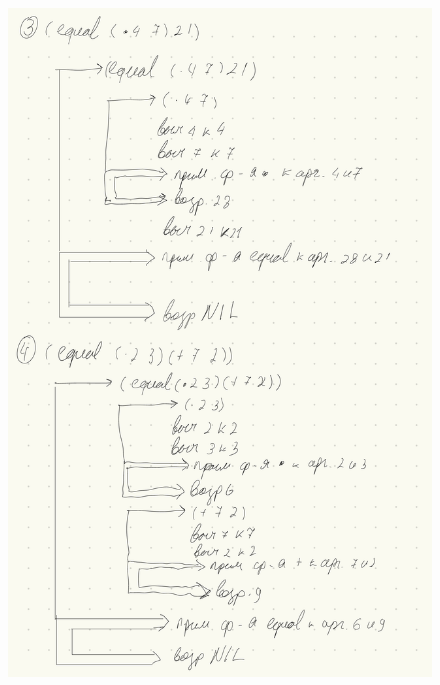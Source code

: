 \begin{enumerate}[wide=0pt]
\begin{figure}[ht!]
	\centering
	\includegraphics[width=1\linewidth]{assets/task1/2.pdf}
\end{figure}
\FloatBarrier
\begin{figure}[ht!]
	\centering

\end{figure}
\end{enumerate}
